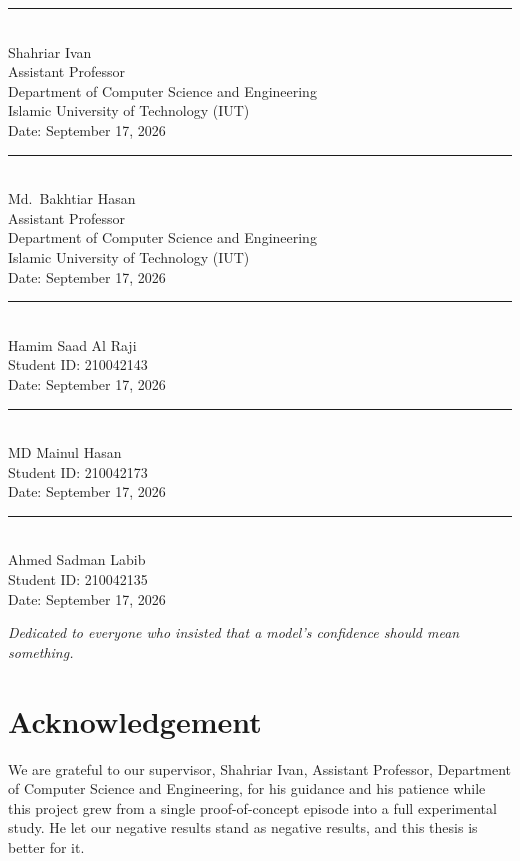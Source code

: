 \documentclass[12pt,a4paper,oneside]{report}
\begin{document}
\vspace{1.5cm}
\noindent
{\small
\begin{minipage}[t]{0.58\textwidth}
\rule{6cm}{0.4pt}\\
Shahriar Ivan\\
Assistant Professor\\
Department of Computer Science and Engineering\\
Islamic University of Technology (IUT)\\
Date: September 17, 2026\\[1.4cm]
\rule{6cm}{0.4pt}\\
Md.\ Bakhtiar Hasan\\
Assistant Professor\\
Department of Computer Science and Engineering\\
Islamic University of Technology (IUT)\\
Date: September 17, 2026
\end{minipage}%
\hfill
\begin{minipage}[t]{0.38\textwidth}
\rule{5cm}{0.4pt}\\
Hamim Saad Al Raji\\
Student ID: 210042143\\
Date: September 17, 2026\\[1.2cm]
\rule{5cm}{0.4pt}\\
MD Mainul Hasan\\
Student ID: 210042173\\
Date: September 17, 2026\\[1.2cm]
\rule{5cm}{0.4pt}\\
Ahmed Sadman Labib\\
Student ID: 210042135\\
Date: September 17, 2026
\end{minipage}}

\clearpage
\vspace*{\fill}
\begin{center}
\itshape Dedicated to everyone who insisted that a model's confidence should mean something.
\end{center}
\vspace*{\fill}

\chapter*{Acknowledgement}
We are grateful to our supervisor, Shahriar Ivan, Assistant Professor, Department of Computer
Science and Engineering, for his guidance and his patience while this project grew from a single
proof-of-concept episode into a full experimental study. He let our negative results stand as
negative results, and this thesis is better for it.
\end{document}
